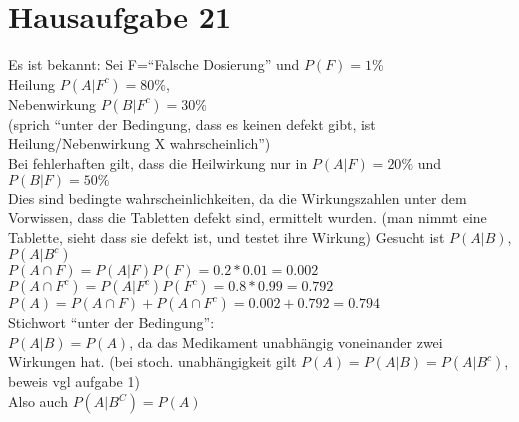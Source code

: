 \documentclass{article}
\begin{document}
	\section{Hausaufgabe 21}
	Es ist bekannt:	Sei F=``Falsche Dosierung'' und $P(F)=1\%$\\
	Heilung $P(A|F^c)=80\%$,\\
	Nebenwirkung $P(B|F^c)=30\%$\\
	(sprich ``unter der Bedingung, dass es keinen defekt gibt, ist Heilung/Nebenwirkung X wahrscheinlich'')\\
	Bei fehlerhaften gilt, dass die Heilwirkung nur in $P(A|F)=20\%$ und $P(B|F)=50\%$\\
	Dies sind bedingte wahrscheinlichkeiten, da die Wirkungszahlen unter dem Vorwissen, dass die Tabletten defekt sind, ermittelt wurden. (man nimmt eine Tablette, sieht dass sie defekt ist, und testet ihre Wirkung)
	Gesucht ist $P(A|B)$, $P(A|B^c)$\\
	$P(A\cap F) = P(A|F)P(F)=0.2*0.01 = 0.002$\\
	$P(A\cap F^c) = P(A|F^c)P(F^c) = 0.8 * 0.99 = 0.792$\\
	$P(A)=P(A\cap F)+P(A\cap F^c) = 0.002+0.792 = 0.794$\\
	Stichwort ``unter der Bedingung'':\\
	$P(A|B) = P(A)$, da das Medikament unabhängig voneinander zwei Wirkungen hat. (bei stoch. unabhängigkeit gilt $P(A)=P(A|B) = P(A|B^c)$, beweis vgl aufgabe 1)\\
	Also auch $P(A|B^C) = P(A)$
\end{document}
